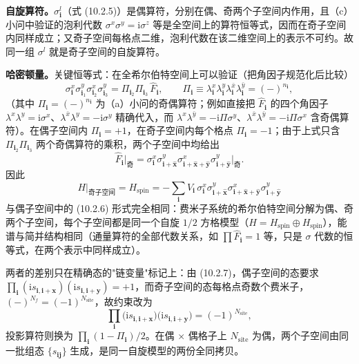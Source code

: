 \textbf{自旋算符。}$\sigma_{\pmb i}^{l}$（式 (10.2.5)）是偶算符，分别在偶、奇两个子空间内作用，且（c）小问中验证的泡利代数 $\sigma^{x}\sigma^{y}=\mathrm{i}\sigma^{z}$ 等是全空间上的算符恒等式，因而在奇子空间内同样成立；又奇子空间每格点二维，泡利代数在该二维空间上的表示不可约。故同一组 $\sigma^{l}$ 就是奇子空间的自旋算符。

\textbf{哈密顿量。}关键恒等式：在全希尔伯特空间上可以验证（把角因子规范化后比较）
\begin{equation*}
\sigma_{\pmb i}^{x}\sigma_{\pmb i_1}^{y}\sigma_{\pmb i_2}^{x}\sigma_{\pmb i_3}^{y}
=\Pi_{\pmb i_2}\Pi_{\pmb i_3}\,\hat F_{\pmb i},\qquad
\Pi_{\pmb i}\equiv\lambda_{\pmb i}^{x}\lambda_{\pmb i}^{y}\lambda_{\pmb i}^{\bar x}\lambda_{\pmb i}^{\bar y}=(-)^{n_{\pmb i}},
\end{equation*}
（其中 $\Pi_{\pmb i}=(-)^{n_{\pmb i}}$ 为（a）小问的奇偶算符；例如直接把 $\hat F_{\pmb i}$ 的四个角因子 $\lambda^{x}\lambda^{y}=\mathrm{i}\sigma^{x}$、$\lambda^{\bar x}\lambda^{y}=-\mathrm{i}\sigma^{y}$ 精确代入，而 $\lambda^{x}\lambda^{\bar y}=-\mathrm{i}\Pi\sigma^{y}$、$\lambda^{\bar x}\lambda^{\bar y}=-\mathrm{i}\Pi\sigma^{x}$ 含奇偶算符）。在偶子空间内 $\Pi_{\pmb i}=+1$，在奇子空间内每个格点 $\Pi_{\pmb i}=-1$；由于上式只含 $\Pi_{\pmb i_2}\Pi_{\pmb i_3}$ 两个奇偶算符的乘积，两个子空间中均给出
\begin{equation*}
\hat F_{\pmb i}\Big|_{\text{奇}}=\sigma_{\pmb i}^{x}\sigma_{\pmb i+\hat{\pmb x}}^{y}\sigma_{\pmb i+\hat{\pmb x}+\hat{\pmb y}}^{x}\sigma_{\pmb i+\hat{\pmb y}}^{y}\Big|_{\text{奇}} .
\end{equation*}
因此
\begin{equation*}
\boxed{\;H\big|_{\text{奇子空间}}=H_{\text{spin}}=-\sum_{\pmb i}V_{\pmb i}\,\sigma_{\pmb i}^{x}\sigma_{\pmb i+\hat{\pmb x}}^{y}\sigma_{\pmb i+\hat{\pmb x}+\hat{\pmb y}}^{x}\sigma_{\pmb i+\hat{\pmb y}}^{y}\;}
\end{equation*}
与偶子空间中的 (10.2.6) 形式完全相同：费米子系统的希尔伯特空间分解为偶、奇两个子空间，每个子空间都是同一个自旋 $1/2$ 方格模型（$H=H_{\text{spin}}\oplus H_{\text{spin}}$），能谱与简并结构相同（通量算符的全部代数关系，如 $\prod\hat F_{\pmb i}=1$ 等，只是 $\sigma$ 代数的恒等式，在两个表示中同样成立）。

两者的差别只在精确态的"链变量"标记上：由 (10.2.7)，偶子空间的态要求 $\prod_{\pmb i}(\mathrm{i}s_{\pmb i,\pmb i+\pmb x})(\mathrm{i}s_{\pmb i,\pmb i+\pmb y})=+1$，而奇子空间的态每格点奇数个费米子，$(-)^{N_f}=(-1)^{N_{\text{site}}}$，故约束改为
\begin{equation*}
\prod_{\pmb i}\big(\mathrm{i}s_{\pmb i,\pmb i+\pmb x}\big)\big(\mathrm{i}s_{\pmb i,\pmb i+\pmb y}\big)=(-1)^{N_{\text{site}}},
\end{equation*}
投影算符则换为 $\prod_{\pmb i}(1-\Pi_{\pmb i})/2$。在偶 $\times$ 偶格子上 $N_{\text{site}}$ 为偶，两个子空间由同一批组态 $\{s_{\pmb{ij}}\}$ 生成，是同一自旋模型的两份全同拷贝。

